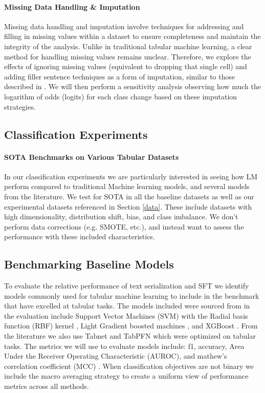\documentclass{article}
\theoremstyle{plain}
\theoremstyle{definition}
\theoremstyle{remark}
\begin{document}
\paragraph{Missing Data Handling \& Imputation} Missing data handling and imputation involve techniques for addressing and filling in missing values within a dataset to ensure completeness and maintain the integrity of the analysis. Unlike in traditional tabular machine learning, a clear method for handling missing values remains unclear. Therefore, we explore the effects of ignoring missing values (equivalent to dropping that single cell) and adding filler sentence techniques as a form of imputation, similar to those described in \cite{lee2024multimodal}. We will then perform a sensitivity analysis observing how much the logarithm of odds (logits) for each class change based on these imputation strategies.

\subsection*{Classification Experiments}

\paragraph{SOTA Benchmarks on Various Tabular Datasets} In our classification experiments we are particularly interested in seeing how LM perform compared to traditional Machine learning models, and several models from the literature. We test for SOTA in all the baseline datasets as well as our experimental datasets referenced in Section \ref{data}. These include datasets with high dimensionality, distribution shift, bias, and class imbalance. We don't perform data corrections (e.g. SMOTE, etc.), and instead want to assess the performance with these included characteristics.


\subsection{Benchmarking Baseline Models}

To evaluate the relative performance of text serialization and SFT we identify models commonly used for tabular machine learning to include in the benchmark that have excelled at tabular tasks. The models included were sourced from \cite{dinh2022lift, hegselmann2023tabllm} in the evaluation include Support Vector Machines (SVM) with the Radial basis function (RBF) kernel \cite{cortes1995support}, Light Gradient boosted machines \cite{ke2017lightgbm}, and XGBoost \cite{chen2016xgboost}. From the literature we also use Tabnet \cite{arik2021tabnet} and TabPFN \cite{hollmann2022tabpfn} which were optimized on tabular tasks. The metrics we will use to evaluate models include: f1, accuracy, Area Under the Receiver Operating Characteristic (AUROC), and mathew's correlation coefficient (MCC) \cite{chicco2020advantages}. When classification objectives are not binary we include the macro averaging strategy to create a uniform view of performance metrics across all methods. 
\end{document}
